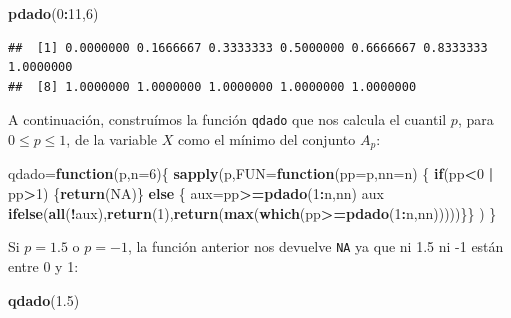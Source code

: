 \documentclass[]{book}
\newenvironment{Shaded}{\begin{snugshade}}{\end{snugshade}}
\newcommand{\ControlFlowTok}[1]{\textcolor[rgb]{0.13,0.29,0.53}{\textbf{#1}}}
\newcommand{\DataTypeTok}[1]{\textcolor[rgb]{0.13,0.29,0.53}{#1}}
\newcommand{\DecValTok}[1]{\textcolor[rgb]{0.00,0.00,0.81}{#1}}
\newcommand{\FloatTok}[1]{\textcolor[rgb]{0.00,0.00,0.81}{#1}}
\newcommand{\KeywordTok}[1]{\textcolor[rgb]{0.13,0.29,0.53}{\textbf{#1}}}
\newcommand{\NormalTok}[1]{#1}
\newcommand{\OperatorTok}[1]{\textcolor[rgb]{0.81,0.36,0.00}{\textbf{#1}}}
\newcommand{\OtherTok}[1]{\textcolor[rgb]{0.56,0.35,0.01}{#1}}
\newcommand{\StringTok}[1]{\textcolor[rgb]{0.31,0.60,0.02}{#1}}
\begin{document}
\begin{Shaded}
\begin{Highlighting}[]
\KeywordTok{pdado}\NormalTok{(}\DecValTok{0}\OperatorTok{:}\DecValTok{11}\NormalTok{,}\DecValTok{6}\NormalTok{)}
\end{Highlighting}
\end{Shaded}

\begin{verbatim}
##  [1] 0.0000000 0.1666667 0.3333333 0.5000000 0.6666667 0.8333333 1.0000000
##  [8] 1.0000000 1.0000000 1.0000000 1.0000000 1.0000000
\end{verbatim}

A continuación, construímos la función \texttt{qdado} que nos calcula el cuantil \(p\), para \(0\leq p\leq 1\), de la variable \(X\) como el mínimo del conjunto \(A_p\):

\begin{Shaded}
\begin{Highlighting}[]
\NormalTok{qdado=}\ControlFlowTok{function}\NormalTok{(p,}\DataTypeTok{n=}\DecValTok{6}\NormalTok{)\{}
\KeywordTok{sapply}\NormalTok{(p,}\DataTypeTok{FUN=}\ControlFlowTok{function}\NormalTok{(}\DataTypeTok{pp=}\NormalTok{p,}\DataTypeTok{nn=}\NormalTok{n) }
\NormalTok{  \{}
  \ControlFlowTok{if}\NormalTok{(pp}\OperatorTok{<}\DecValTok{0} \OperatorTok{|}\StringTok{ }\NormalTok{pp}\OperatorTok{>}\DecValTok{1}\NormalTok{) \{}\KeywordTok{return}\NormalTok{(}\OtherTok{NA}\NormalTok{)\}}
  \ControlFlowTok{else}\NormalTok{ \{}
\NormalTok{  aux=pp}\OperatorTok{>=}\KeywordTok{pdado}\NormalTok{(}\DecValTok{1}\OperatorTok{:}\NormalTok{n,nn)}
\NormalTok{  aux}
  \KeywordTok{ifelse}\NormalTok{(}\KeywordTok{all}\NormalTok{(}\OperatorTok{!}\NormalTok{aux),}\KeywordTok{return}\NormalTok{(}\DecValTok{1}\NormalTok{),}\KeywordTok{return}\NormalTok{(}\KeywordTok{max}\NormalTok{(}\KeywordTok{which}\NormalTok{(pp}\OperatorTok{>=}\KeywordTok{pdado}\NormalTok{(}\DecValTok{1}\OperatorTok{:}\NormalTok{n,nn)))))\}\}}
\NormalTok{)}
\NormalTok{\}}
\end{Highlighting}
\end{Shaded}

Si \(p=1.5\) o \(p=-1\), la función anterior nos devuelve \texttt{NA} ya que ni 1.5 ni -1 están entre 0 y 1:

\begin{Shaded}
\begin{Highlighting}[]
\KeywordTok{qdado}\NormalTok{(}\FloatTok{1.5}\NormalTok{)}
\end{Highlighting}
\end{Shaded}
\end{document}
